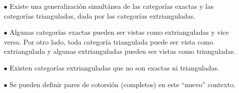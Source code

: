 \documentclass[preview]{standalone}
\begin{document}
\begin{center}
\begin{itemize}
                        \item[$\bullet$] Existe una generalización simultánea de las categorías exactas y las categorías trianguladas, dada por las categorías extrianguladas.
                        \item[$\bullet$] Algunas categorías exactas pueden ser vistas como extrianguladas y vice versa. Por otro lado, toda categoría triangulada puede ser vista como extriangulada y algunas extrianguladas pueden ser vistas como trianguladas.
                        \item[$\bullet$] Existen categorías extrianguladas que no son exactas ni trianguladas.
                        \item[$\bullet$] Se pueden definir pares de cotorsión (completos) en este ``nuevo'' contexto.
                    \end{itemize}
\end{center}
\end{document}
